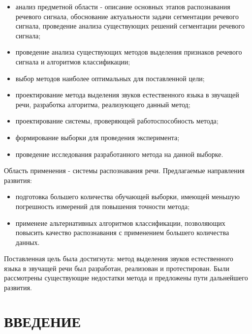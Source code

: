 \documentclass[utf8x, 14pt, oneside, a4paper]{article}
\begin{document}
	\begin{itemize}
		\item анализ предметной области - описание основных этапов распознавания речевого сигнала, обоснование актуальности задачи сегментации речевого сигнала, проведение анализа существующих решений сегментации речевого сигнала;
		\item проведение анализа существующих методов выделения признаков речевого сигнала и алгоритмов классификации;
		\item выбор методов наиболее оптимальных для поставленной цели;
		\item проектирование метода выделения звуков естественного языка в звучащей речи, разработка алгоритма, реализующего данный метод;
		\item проектирование системы, проверяющей работоспособность метода;
		\item формирование выборки для проведения эксперимента;
		\item проведение исследования разработанного метода на данной выборке.
	\end{itemize}

	Область применения - системы распознавания речи. Предлагаемые направления развития:
	
	\begin{itemize}
		\item подготовка большего количества обучающей выборки, имеющей меньшую погрешность измерений для повышения точности метода;
		\item применеие альтернативных алгоритмов классификации, позволяющих повысить качество распознавания с применением большего количества данных.
	\end{itemize}

	Поставленная цель была достигнута: метод выделения звуков естественного языка в звучащей речи был разработан, реализован и протестирован. Были рассмотрены существующие недостатки метода и предложены пути дальнейшего развития.
	
	\pagebreak
	
	\renewcommand{\contentsname}{\normalsize\bfseries\centering СОДЕРЖАНИЕ}
	\small
	\tableofcontents
	\normalsize
	
	\pagebreak
	
	\section*{ВВЕДЕНИЕ}
	
\end{document}
